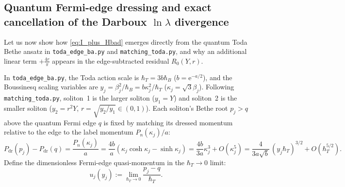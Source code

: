 \documentclass[11pt,a4paper]{article}
\newcommand{\ee}{\mathrm{e}}
\newcommand{\hb}{\hbar}
\begin{document}
\subsection{Quantum Fermi-edge dressing and exact cancellation of the Darboux $\ln\lambda$ divergence}

Let us now show how \eqref{eq:I_plus_Hbad} emerges directly from the quantum Toda
Bethe ansatz in \texttt{toda\_edge\_ba.py} and \texttt{matching\_toda.py}, and why
an additional linear term $+\frac{4r}{\pi}$ appears in the edge-subtracted
residual $R_0(Y,r)$.

In \texttt{toda\_edge\_ba.py}, the Toda action scale is $\hb_T = 3b\hb_B$
($b = \ee^{-a/2}$), and the Boussinesq scaling variables are $y_j = \beta_j^2/\hb_B = b\kappa_j^2/\hb_T$
($\kappa_j = \sqrt{3}\beta_j$). Following \texttt{matching\_toda.py}, soliton~1 is
the larger soliton ($y_1 = Y$) and soliton~2 is the smaller soliton ($y_2 = r^2 Y$,
$r = \sqrt{y_2/y_1} \in (0,1)$). Each soliton's Bethe root $p_j > q$ above the
quantum Fermi edge $q$ is fixed by matching its dressed momentum relative to the
edge to the label momentum $P_n(\kappa_j)/a$:
\begin{equation}
  P_{\mathrm{dr}}(p_j) - P_{\mathrm{dr}}(q)
  = \frac{P_n(\kappa_j)}{a}
  = \frac{4b}{a}(\kappa_j\cosh\kappa_j - \sinh\kappa_j)
  = \frac{4b}{3a}\kappa_j^3 + O(\kappa_j^5)
  = \frac{4}{3a\sqrt{b}}\,(y_j\hb_T)^{3/2} + O(\hb_T^{5/2}).
  \label{eq:P_dr_matching}
\end{equation}
Define the dimensionless Fermi-edge quasi-momentum in the $\hb_T\to 0$ limit:
\begin{equation}
  u_j(y_j) := \lim_{\hb_T\to 0} \frac{p_j - q}{\hb_T}.
  \label{eq:u_def}
\end{equation}
\end{document}
